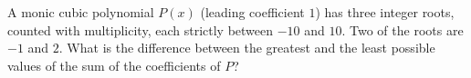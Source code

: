 A monic cubic polynomial $P(x)$ (leading coefficient $1$) has three integer roots, counted with multiplicity, each strictly between $-10$ and $10$. Two of the roots are $-1$ and $2$. What is the difference between the greatest and the least possible values of the sum of the coefficients of $P$?
